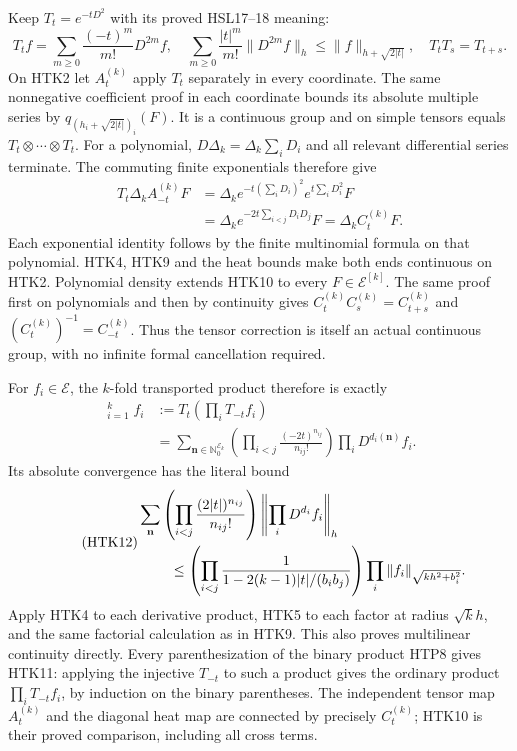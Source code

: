 Keep $T_t=e^{-tD^2}$ with its proved HSL17--18 meaning:
\[
 T_tf=\sum_{m\ge0}\frac{(-t)^m}{m!}D^{2m}f,
 \quad \sum_{m\ge0}\frac{|t|^m}{m!}\|D^{2m}f\|_h
                  \le\|f\|_{h+\sqrt{2|t|}},
 \quad T_tT_s=T_{t+s}.
\]
On HTK2 let $A_t^{(k)}$ apply $T_t$ separately in every
coordinate. The same nonnegative coefficient proof in each
coordinate bounds its absolute multiple series by
$q_{(h_i+\sqrt{2|t|})_i}(F)$. It is a continuous group and
on simple tensors equals $T_t\otimes\cdots\otimes T_t$.
For a polynomial, $D\Delta_k=\Delta_k\sum_iD_i$ and all
relevant differential series terminate. The commuting finite
exponentials therefore give
\begin{equation}\tag{HTK10}
\begin{split}
 T_t\Delta_k A_{-t}^{(k)}F
 &=\Delta_k e^{-t(\sum_iD_i)^2}e^{t\sum_iD_i^2}F\\
 &=\Delta_k e^{-2t\sum_{i<j}D_iD_j}F
  =\Delta_k C_t^{(k)}F.
\end{split}
\end{equation}
Each exponential identity follows by the finite multinomial
formula on that polynomial. HTK4, HTK9 and the heat bounds
make both ends continuous on HTK2. Polynomial density extends
HTK10 to every $F\in\mathcal E^{[k]}$. The same proof first
on polynomials and then by continuity gives
$C_t^{(k)}C_s^{(k)}=C_{t+s}^{(k)}$ and
$(C_t^{(k)})^{-1}=C_{-t}^{(k)}$. Thus the tensor correction
is itself an actual continuous group, with no infinite formal
cancellation required.

For $f_i\in\mathcal E$, the $k$-fold transported product
therefore is exactly
\begin{equation}\tag{HTK11}
\boxed{\begin{aligned}
 \mathop{\star_t}_{i=1}^k f_i
 &:=T_t\left(\prod_iT_{-t}f_i\right)\\
 &=\sum_{\mathbf n\in\mathbb N_0^{\mathscr E_k}}
     \left(\prod_{i<j}\frac{(-2t)^{n_{ij}}}{n_{ij}!}\right)
                      \prod_i D^{d_i(\mathbf n)}f_i.
\end{aligned}}
\end{equation}
Its absolute convergence has the literal bound
\begin{equation}\tag{HTK12}
\begin{split}
 &\sum_{\mathbf n}
    \left(\prod_{i<j}\frac{(2|t|)^{n_{ij}}}{n_{ij}!}\right)
                  \left\|\prod_iD^{d_i}f_i\right\|_h\\
 &\hspace{8mm}\le
       \left(\prod_{i<j}\frac1{1-2(k-1)|t|/(b_ib_j)}\right)
                  \prod_i\|f_i\|_{\sqrt{kh^2+b_i^2}}.
\end{split}
\end{equation}
Apply HTK4 to each derivative product, HTK5 to each factor
at radius $\sqrt{k}h$, and the same factorial calculation
as in HTK9. This also proves multilinear continuity directly.
Every parenthesization of the binary product HTP8 gives HTK11:
applying the injective $T_{-t}$ to such a product gives the
ordinary product $\prod_iT_{-t}f_i$, by induction on the
binary parentheses. The independent tensor map $A_t^{(k)}$
and the diagonal heat map are connected by precisely $C_t^{(k)}$;
HTK10 is their proved comparison, including all cross terms.

